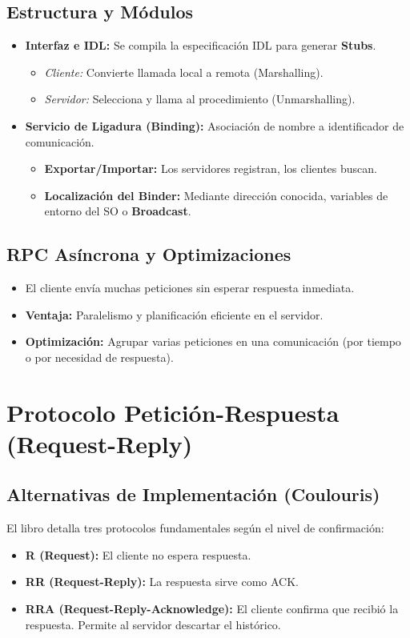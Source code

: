 \subsection{Estructura y Módulos}
\begin{itemize}
    \item \textbf{Interfaz e IDL:} Se compila la especificación IDL para generar \textbf{Stubs}.
    \begin{itemize}
        \item \textit{Cliente:} Convierte llamada local a remota (Marshalling).
        \item \textit{Servidor:} Selecciona y llama al procedimiento (Unmarshalling).
    \end{itemize}
    \item \textbf{Servicio de Ligadura (Binding):} Asociación de nombre a identificador de comunicación.
    \begin{itemize}
        \item \textbf{Exportar/Importar:} Los servidores registran, los clientes buscan.
        \item \textbf{Localización del Binder:} Mediante dirección conocida, variables de entorno del SO o \textbf{Broadcast}.
    \end{itemize}
\end{itemize}

\subsection{RPC Asíncrona y Optimizaciones}
\begin{itemize}
    \item El cliente envía muchas peticiones sin esperar respuesta inmediata.
    \item \textbf{Ventaja:} Paralelismo y planificación eficiente en el servidor.
    \item \textbf{Optimización:} Agrupar varias peticiones en una comunicación (por tiempo o por necesidad de respuesta).
\end{itemize}

\section{Protocolo Petición-Respuesta (Request-Reply)}

\subsection{Alternativas de Implementación (Coulouris)}
El libro detalla tres protocolos fundamentales según el nivel de confirmación:
\begin{itemize}
    \item \textbf{R (Request):} El cliente no espera respuesta.
    \item \textbf{RR (Request-Reply):} La respuesta sirve como ACK.
    \item \textbf{RRA (Request-Reply-Acknowledge):} El cliente confirma que recibió la respuesta. Permite al servidor descartar el histórico.
\end{itemize}



